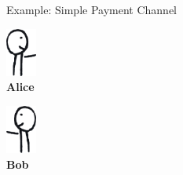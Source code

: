 \documentclass[handout]{beamer}
\begin{document}
\begin{frame}{Example: Simple Payment Channel}
	\begin{minipage}{0.1\linewidth}
		\vspace{-0.5cm}
		\centering
		\includegraphics[width=1cm]{../assets/images/agents/handing_right}
		\\ \hspace{-0.35cm} \textbf{Alice}
	\end{minipage}%
	\begin{minipage}{0.8\linewidth}
		\begin{figure}
		\begin{tikzpicture}[scale=0.9, every node/.style={scale=0.9}]
			
		\end{tikzpicture}
		\vspace{0.5cm}
		\end{figure}
	\end{minipage}%
	\begin{minipage}{0.1\linewidth}
		\vspace{-0.5cm}
		\centering
		\includegraphics[width=1cm]{../assets/images/agents/handing_left}
		\\ \hspace{0.3cm}\textbf{Bob}
	\end{minipage}
\end{frame}

\end{document}
